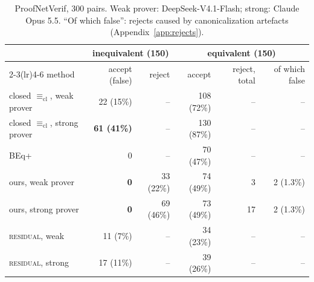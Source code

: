\documentclass[10pt]{article}
\theoremstyle{definition}
\newcommand{\Ecl}{\mathrel{\equiv_{\mathrm{cl}}}}
\newcommand{\V}[1]{\textsc{#1}}
\begin{document}
\begin{table}[t]
\centering\small
\begin{tabular}{lrrrrr}
\toprule
& \multicolumn{2}{c}{inequivalent (150)} & \multicolumn{3}{c}{equivalent (150)}\\
\cmidrule(lr){2-3}\cmidrule(lr){4-6}
method & accept (false) & reject & accept & reject, total & of which false\\
\midrule
closed $\Ecl$, weak prover & 22 (15\%) & -- & 108 (72\%) & -- & --\\
closed $\Ecl$, strong prover & \textbf{61 (41\%)} & -- & 130 (87\%) & -- & --\\
BEq+ & 0 & -- & 70 (47\%) & -- & --\\
ours, weak prover & \textbf{0} & 33 (22\%) & 74 (49\%) & 3 & 2 (1.3\%)\\
ours, strong prover & \textbf{0} & 69 (46\%) & 73 (49\%) & 17 & 2 (1.3\%)\\
\quad \V{residual}, weak & 11 (7\%) & -- & 34 (23\%) & -- & --\\
\quad \V{residual}, strong & 17 (11\%) & -- & 39 (26\%) & -- & --\\
\bottomrule
\end{tabular}
\caption{ProofNetVerif, 300 pairs. Weak prover: DeepSeek-V4.1-Flash; strong: Claude Opus 5.5.
``Of which false'': rejects caused by canonicalization artefacts (Appendix~\ref{app:rejects}).}
\label{tab:g1}
\end{table}
\end{document}
